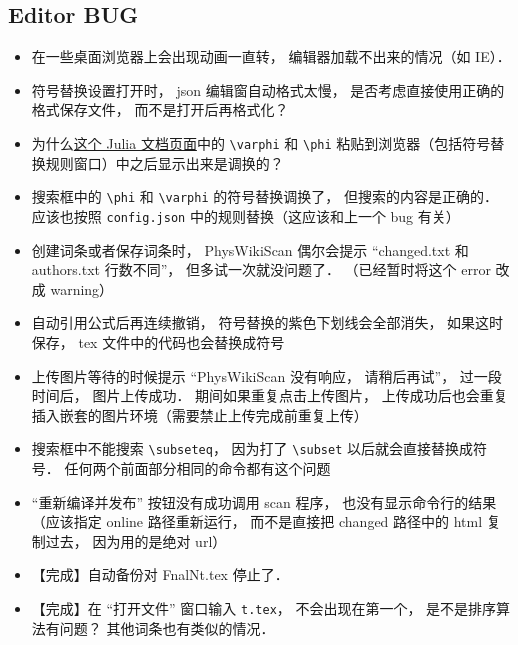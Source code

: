 
\subsection{Editor BUG}

\begin{itemize}
\item 在一些桌面浏览器上会出现动画一直转， 编辑器加载不出来的情况（如 IE）．

\item 符号替换设置打开时， json 编辑窗自动格式太慢， 是否考虑直接使用正确的格式保存文件， 而不是打开后再格式化？

\item 为什么\href{https://docs.julialang.org/en/v1/manual/unicode-input/}{这个 Julia 文档页面}中的 \lstinline|\varphi| 和 \lstinline|\phi| 粘贴到浏览器（包括符号替换规则窗口）中之后显示出来是调换的？

\item 搜索框中的 \lstinline|\phi| 和 \lstinline|\varphi| 的符号替换调换了， 但搜索的内容是正确的． 应该也按照 \lstinline|config.json| 中的规则替换（这应该和上一个 bug 有关）

\item 创建词条或者保存词条时， PhysWikiScan 偶尔会提示 “changed.txt 和 authors.txt 行数不同”， 但多试一次就没问题了． （已经暂时将这个 error 改成 warning）

\item 自动引用公式后再连续撤销， 符号替换的紫色下划线会全部消失， 如果这时保存， tex 文件中的代码也会替换成符号

\item 上传图片等待的时候提示 “PhysWikiScan 没有响应， 请稍后再试”， 过一段时间后， 图片上传成功． 期间如果重复点击上传图片， 上传成功后也会重复插入嵌套的图片环境（需要禁止上传完成前重复上传）

\item 搜索框中不能搜索 \lstinline|\subseteq|， 因为打了 \lstinline|\subset| 以后就会直接替换成符号． 任何两个前面部分相同的命令都有这个问题

\item “重新编译并发布” 按钮没有成功调用 scan 程序， 也没有显示命令行的结果（应该指定 online 路径重新运行， 而不是直接把 changed 路径中的 html 复制过去， 因为用的是绝对 url）

\item 【完成】自动备份对 FnalNt.tex 停止了．

\item 【完成】在 “打开文件” 窗口输入 \lstinline|t.tex|， 不会出现在第一个， 是不是排序算法有问题？ 其他词条也有类似的情况．


\end{itemize}
